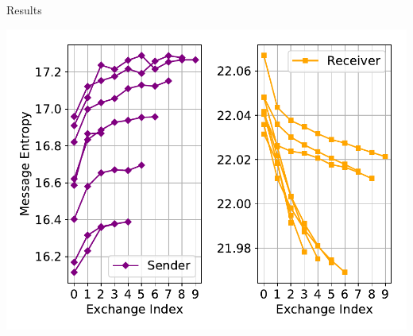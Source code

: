 \documentclass[final]{beamer}
\newlength{\twocolwid}
\begin{document}
\begin{frame}[t]
\begin{columns}[t]
\begin{column}{\twocolwid}
\begin{block}{Results}
\begin{minipage}{.3\textwidth}
  \includegraphics[width=\textwidth]{figures/SR_msg_entropy_adaptive_indomain_pt_best_02}
\end{minipage}

\vspace{5mm}


\end{block}
\end{column}
\end{columns}
\end{frame}
\end{document}
